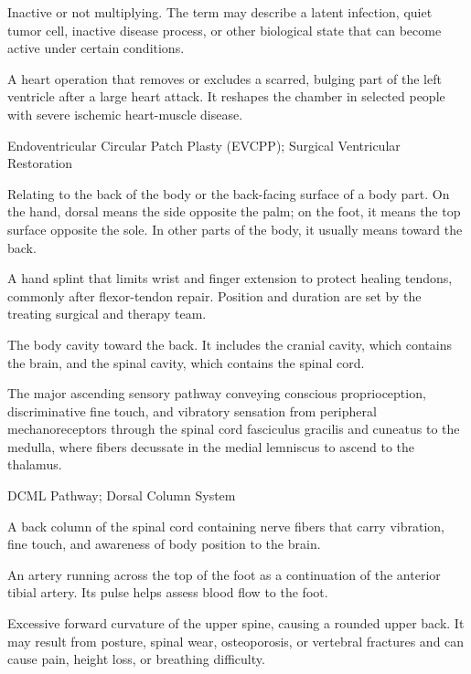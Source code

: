  Inactive or not multiplying. The term may describe a latent infection, quiet tumor cell, inactive disease process, or other biological state that can become active under certain conditions.

 A heart operation that removes or excludes a scarred, bulging part of the left ventricle after a large heart attack. It reshapes the chamber in selected people with severe ischemic heart-muscle disease.

\synonyms
Endoventricular Circular Patch Plasty (EVCPP); Surgical Ventricular Restoration

 Relating to the back of the body or the back-facing surface of a body part. On the hand, dorsal means the side opposite the palm; on the foot, it means the top surface opposite the sole. In other parts of the body, it usually means toward the back.

 A hand splint that limits wrist and finger extension to protect healing tendons, commonly after flexor-tendon repair. Position and duration are set by the treating surgical and therapy team.

 The body cavity toward the back. It includes the cranial cavity, which contains the brain, and the spinal cavity, which contains the spinal cord.

 The major ascending sensory pathway conveying conscious proprioception, discriminative fine touch, and vibratory sensation from peripheral mechanoreceptors through the spinal cord fasciculus gracilis and cuneatus to the medulla, where fibers decussate in the medial lemniscus to ascend to the thalamus.

\synonyms
DCML Pathway; Dorsal Column System

 A back column of the spinal cord containing nerve fibers that carry vibration, fine touch, and awareness of body position to the brain.

 An artery running across the top of the foot as a continuation of the anterior tibial artery. Its pulse helps assess blood flow to the foot.

 Excessive forward curvature of the upper spine, causing a rounded upper back. It may result from posture, spinal wear, osteoporosis, or vertebral fractures and can cause pain, height loss, or breathing difficulty.

